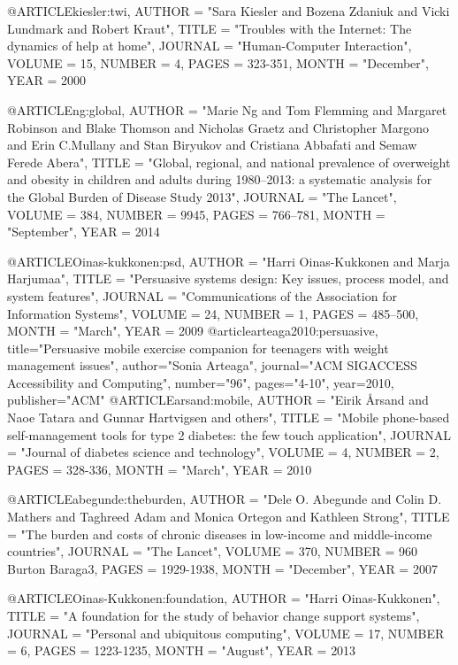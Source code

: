@ARTICLE{kiesler:twi,
	AUTHOR = "Sara Kiesler and Bozena Zdaniuk and Vicki Lundmark and Robert Kraut",
	TITLE = "Troubles with the Internet: The dynamics of help at home",
	JOURNAL = "Human-Computer Interaction",
	VOLUME = {15},
	NUMBER = {4},
	PAGES = {323-351},
	MONTH = "December",
	YEAR = {2000}	}

@ARTICLE{ng:global,
	AUTHOR = "Marie Ng and Tom Flemming and Margaret Robinson and Blake Thomson and Nicholas Graetz and Christopher Margono and  Erin C.Mullany and Stan Biryukov and Cristiana Abbafati and Semaw Ferede Abera",
	TITLE = "Global, regional, and national prevalence of overweight and obesity in children and adults during 1980--2013: a systematic analysis for the Global Burden of Disease Study 2013",
	JOURNAL = "The Lancet",
	VOLUME = {384},
	NUMBER = {9945},
	PAGES = {766--781},
	MONTH = "September",
	YEAR = {2014}	}

@ARTICLE{Oinas-kukkonen:psd,
	AUTHOR = "Harri Oinas-Kukkonen and Marja Harjumaa",
	TITLE = "Persuasive systems design: Key issues, process model, and system features",
	JOURNAL = "Communications of the Association for Information Systems",
	VOLUME = {24},
	NUMBER = {1},
	PAGES = {485–500},
	MONTH = "March",
	YEAR = {2009}	}
@article{arteaga2010:persuasive,
  title="Persuasive mobile exercise companion for teenagers with weight management issues",
  author="Sonia Arteaga",
  journal="ACM SIGACCESS Accessibility and Computing",
  number="96",
  pages="4-10",
  year={2010},
  publisher="ACM"
}
@ARTICLE{arsand:mobile,
	AUTHOR = "Eirik {\AA}rsand  and Naoe Tatara and Gunnar Hartvigsen  and others",
	TITLE = "Mobile phone-based self-management tools for type 2 diabetes: the few touch application",
	JOURNAL = "Journal of diabetes science and technology",
	VOLUME = {4},
	NUMBER = {2},
	PAGES = {328-336},
	MONTH = "March",
	YEAR = {2010}	}

@ARTICLE{abegunde:theburden,
	AUTHOR = "Dele O. Abegunde and Colin D. Mathers and Taghreed Adam and Monica Ortegon and Kathleen Strong",
	TITLE = "The burden and costs of chronic diseases in low-income and middle-income countries",
	JOURNAL = "The Lancet",
	VOLUME = {370},
	NUMBER = {960 Burton Baraga3},
	PAGES = {1929-1938},
	MONTH = "December",
	YEAR = {2007}	}

@ARTICLE{Oinas-Kukkonen:foundation,
	AUTHOR = "Harri Oinas-Kukkonen",
	TITLE = "A foundation for the study of behavior change support systems",
	JOURNAL = "Personal and ubiquitous computing",
	VOLUME = {17},
	NUMBER = {6},
	PAGES = {1223-1235},
	MONTH = "August",
	YEAR = {2013}	}


